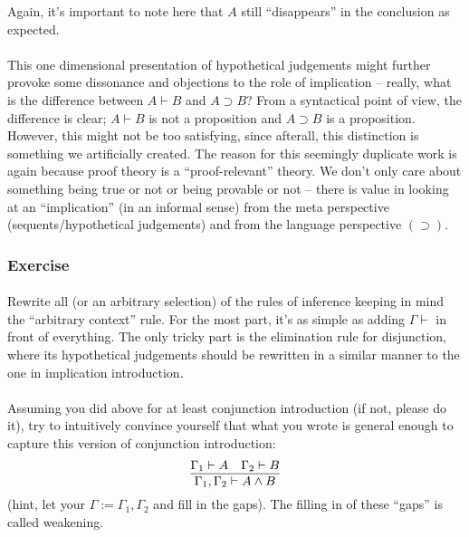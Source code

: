 \documentclass[a4paper]{article}
\begin{document}
Again, it's important to note here that $A$ still ``disappears'' in the
conclusion as expected.

\paragraph{}
This one dimensional presentation of hypothetical judgements might further
provoke some dissonance and objections to the role of implication -- really,
what is the difference between $A \vdash B$ and $A \supset B$? From a
syntactical point of view, the difference is clear; $A \vdash B$ is not a
proposition and $A \supset B$ is a proposition. However, this might not be too
satisfying, since afterall, this distinction is something we artificially
created. The reason for this seemingly duplicate work is again because proof
theory is a ``proof-relevant'' theory. We don't only care about something being
true or not or being provable or not -- there is value in looking at an
``implication'' (in an informal sense) from the meta perspective
(sequents/hypothetical judgements) and from the language perspective
$(\supset)$.

\subsubsection{Exercise}
\paragraph{}
Rewrite all (or an arbitrary selection) of the rules of inference keeping in
mind the ``arbitrary context'' rule. For the most part, it's as simple as adding
$\Gamma \vdash$ in front of everything. The only tricky part is the elimination
rule for disjunction, where its hypothetical judgements should be rewritten in a
similar manner to the one in implication introduction.

\paragraph{}
Assuming you did above for at least conjunction introduction (if not, please do
it), try to intuitively convince yourself that what you wrote is general enough
to capture this version of conjunction introduction:
$$\infer{\Gamma_1, \Gamma_2 \vdash A \land B}{\Gamma_1 \vdash A & \Gamma_2
\vdash B}$$ (hint, let your $\Gamma := \Gamma_1, \Gamma_2$ and fill in the
gaps). The filling in of these ``gaps'' is called weakening.
\end{document}
